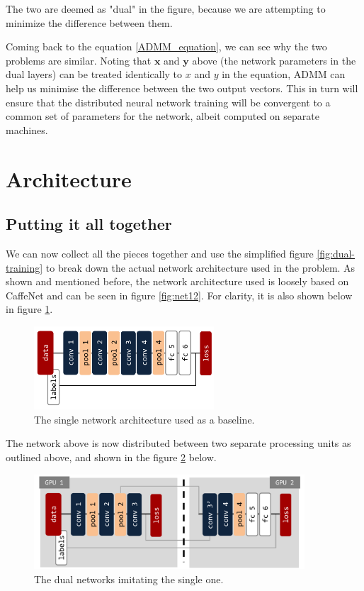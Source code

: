 \documentclass[a4paper, 12pt]{article}
\numberwithin{equation}{section}
\begin{document}
	The two are deemed as "dual" in the figure, because we are attempting to minimize the difference between them.
	
	Coming back to the equation \ref{ADMM_equation}, we can see why the two problems are similar. Noting that $\boldsymbol x$ and $\boldsymbol y$ above (the network parameters in the dual layers) can be treated identically to $x$ and $y$ in the equation, ADMM can help us minimise the difference between the two output vectors. This in turn will ensure that the distributed neural network training will be convergent to a common set of parameters for the network, albeit computed on separate machines.
	
	\section{Architecture}
	
	\subsection{Putting it all together}
	
	We can now collect all the pieces together and use the simplified figure \ref{fig:dual-training} to break down the actual network architecture used in the problem. As shown and mentioned before, the network architecture used is loosely based on CaffeNet and can be seen in figure \ref{fig:net12}. For clarity, it is also shown below in figure \ref{fig:net12pretty}.
	
	\begin{figure}[!h]
		\centering
		\includegraphics[page=1,width=0.6\textwidth]{net12.pdf}
		\caption{\label{fig:net12pretty}{The single network architecture used as a baseline.}}
	\end{figure}
	
	The network above is now distributed between two separate processing units as outlined above, and shown in the figure \ref{fig:net12separate} below.
	
	\begin{figure}[!h]
		\centering
		\includegraphics[page=1,width=0.9\textwidth]{net12separate.pdf}
		\caption{\label{fig:net12separate}{The dual networks imitating the single one.}}
	\end{figure}
	
\end{document}

